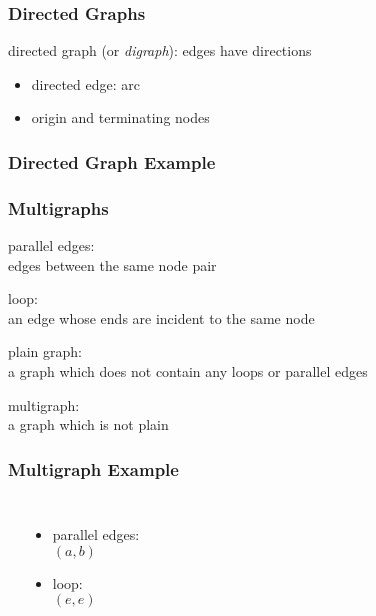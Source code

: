 \documentclass[dvipsnames]{beamer}
\begin{document}
\begin{frame}
  \frametitle{Directed Graphs}

  \begin{definition}
    \alert{directed graph} (or \emph{digraph}): edges have directions

    \pause
    \begin{itemize}
      \item directed edge: \alert{arc}
      \item \alert{origin} and \alert{terminating} nodes
    \end{itemize}
  \end{definition}
\end{frame}

\begin{frame}
  \frametitle{Directed Graph Example}

  \begin{example}
    \begin{center}
    \end{center}
  \end{example}
\end{frame}

\begin{frame}
  \frametitle{Multigraphs}

  \begin{definition}
    \alert{parallel edges}:\\
    edges between the same node pair

    \pause
    \bigskip
    \alert{loop}:\\
    an edge whose ends are incident to the same node

    \pause
    \bigskip
    \alert{plain graph}:\\
    a graph which does not contain any loops or parallel edges

    \pause
    \bigskip
    \alert{multigraph}:\\
    a graph which is not plain
  \end{definition}
\end{frame}

\begin{frame}
  \frametitle{Multigraph Example}

  \begin{example}
    \begin{columns}
      \begin{center}
      \end{center}

      \begin{itemize}
        \item parallel edges:\\
          $(a,b)$
        \item loop:\\
          $(e,e)$
      \end{itemize}
    \end{columns}
  \end{example}
\end{frame}
\end{document}
